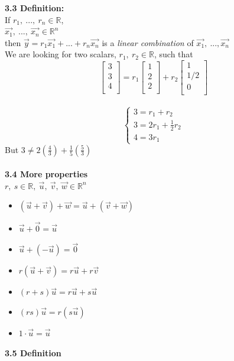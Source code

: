 \documentclass[]{article}
\begin{document}
		\pagebreak
		{\bf 3.3 Definition:}\\
		If $r_1,~...,~r_n\in\mathbb{R}$,\\
		$\vec{x_1},~...,~\vec{x_n}\in\mathbb{R}^n$\\
		then $\vec{y}=r_1\vec{x_1}+...+r_n\vec{x_n}$ is a \emph{linear combination} of $\vec{x_1},~...,\vec{x_n}$\\
		We are looking for two scalars, $r_1,~r_2\in\mathbb{R}$, such that\\
		$$\begin{bmatrix}
			{3}\\
			{3}\\
			{4}\\
		\end{bmatrix}=r_1
		\begin{bmatrix}
			{1}\\
			{2}\\
			{2}\\
		\end{bmatrix}+r_2
		\begin{bmatrix}
			{1}\\
			{1/2}\\
			{0}\\
		\end{bmatrix}
		$$\\
		$$
		 \begin{cases}
			3=r_1+r_2\\
			3=2r_1+\frac{1}{2}r_2\\
			4=3r_1
		\end{cases}
		$$
		But $3\ne 2(\frac{4}{3})+\frac{1}{5}(\frac{5}{3})$\\\\
		{\bf 3.4 More properties}\\
		$r,~s\in\mathbb{R},~\vec{u},~\vec{v},~\vec{w}\in\mathbb{R}^n$
		\begin{itemize}
			\item $(\vec{u}+\vec{v})+\vec{w}=\vec{u}+(\vec{v}+\vec{w})$
			\item $\vec{u}+\vec{0}=\vec{u}$
			\item $\vec{u}+(-\vec{u})=\vec{0}$
			\item $r(\vec{u}+\vec{v})=r\vec{u}+r\vec{v}$
			\item $(r+s)\vec{u}=r\vec{u}+s\vec{u}$
			\item $(rs)\vec{u}=r(s\vec{u})$
			\item $1\cdot\vec{u}=\vec{u}$
		\end{itemize}
		{\bf 3.5 Definition}\\
\end{document}
